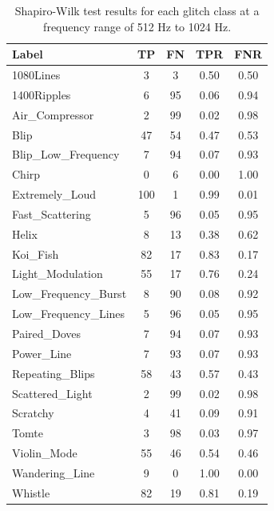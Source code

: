 \documentclass[12pt]{article}
\begin{document}
\begin{table}[H]
  \centering
  \begin{tabular}{lcccc}
  \toprule
  Label & TP & FN & TPR & FNR \\
  \midrule
  1080Lines & 3 & 3 & 0.50 & 0.50 \\
  1400Ripples & 6 & 95 & 0.06 & 0.94 \\
  Air\_Compressor & 2 & 99 & 0.02 & 0.98 \\
  Blip & 47 & 54 & 0.47 & 0.53 \\
  Blip\_Low\_Frequency & 7 & 94 & 0.07 & 0.93 \\
  Chirp & 0 & 6 & 0.00 & 1.00 \\
  Extremely\_Loud & 100 & 1 & 0.99 & 0.01 \\
  Fast\_Scattering & 5 & 96 & 0.05 & 0.95 \\
  Helix & 8 & 13 & 0.38 & 0.62 \\
  Koi\_Fish & 82 & 17 & 0.83 & 0.17 \\
  Light\_Modulation & 55 & 17 & 0.76 & 0.24 \\
  Low\_Frequency\_Burst & 8 & 90 & 0.08 & 0.92 \\
  Low\_Frequency\_Lines & 5 & 96 & 0.05 & 0.95 \\
  Paired\_Doves & 7 & 94 & 0.07 & 0.93 \\
  Power\_Line & 7 & 93 & 0.07 & 0.93 \\
  Repeating\_Blips & 58 & 43 & 0.57 & 0.43 \\
  Scattered\_Light & 2 & 99 & 0.02 & 0.98 \\
  Scratchy & 4 & 41 & 0.09 & 0.91 \\
  Tomte & 3 & 98 & 0.03 & 0.97 \\
  Violin\_Mode & 55 & 46 & 0.54 & 0.46 \\
  Wandering\_Line & 9 & 0 & 1.00 & 0.00 \\
  Whistle & 82 & 19 & 0.81 & 0.19 \\
  \bottomrule
  \end{tabular}
  \caption{Shapiro-Wilk test results for each glitch class at a frequency range of 512 Hz to 1024 Hz.}
  \label{tab:shapiro_high_frequency_results}
\end{table}
\end{document}
